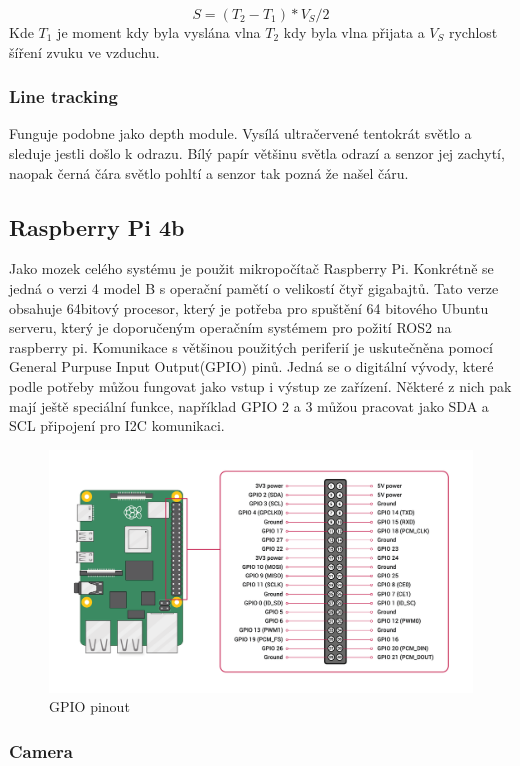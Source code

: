 $$S = (T_2 - T_1) * V_S / 2$$
Kde $T_1$ je moment kdy byla vyslána vlna $T_2$ kdy byla vlna přijata a $V_S$ rychlost šíření zvuku ve vzduchu.

\subsubsection*{Line tracking}
Funguje podobne jako depth module. Vysílá ultračervené tentokrát světlo a sleduje jestli došlo k odrazu. Bílý papír většinu světla odrazí a senzor jej zachytí, naopak černá čára světlo pohltí a senzor tak pozná že našel čáru.

\subsection*{Raspberry Pi 4b}
Jako mozek celého systému je použit mikropočítač Raspberry Pi. Konkrétně se jedná o verzi 4 model B s operační pamětí o velikostí čtyř gigabajtů. Tato verze obsahuje 64bitový procesor, který je potřeba pro spuštění 64 bitového Ubuntu serveru, který je doporučeným operačním systémem pro požití ROS2 na raspberry pi.
Komunikace s většinou použitých periferií je uskutečněna pomocí General Purpuse Input Output(GPIO) pinů. Jedná se o digitální vývody, které podle potřeby můžou fungovat jako vstup i výstup ze zařízení. Některé z nich pak mají ještě speciální funkce, například GPIO 2 a 3 můžou pracovat jako SDA a SCL připojení pro I2C komunikaci.

\begin{figure}[h!]
	\centering
	\includegraphics[scale=0.15]{obrazky-figures/gpio_pinout.png}
	\caption{GPIO pinout}
	\label{}
\end{figure}

\subsubsection*{Camera}

